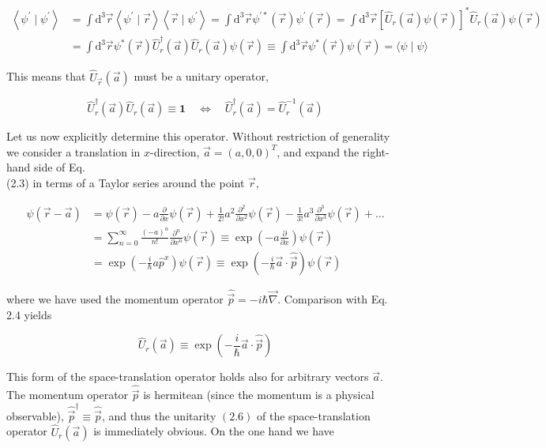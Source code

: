 \documentclass[10pt, letterpaper]{article}
\begin{document}
$$
\begin{aligned}
\left\langle\psi^{\prime} \mid \psi^{\prime}\right\rangle & =\int \mathrm{d}^{3} \vec{r}\left\langle\psi^{\prime} \mid \vec{r}\right\rangle\left\langle\vec{r} \mid \psi^{\prime}\right\rangle=\int \mathrm{d}^{3} \vec{r} \psi^{\prime *}(\vec{r}) \psi^{\prime}(\vec{r})=\int \mathrm{d}^{3} \vec{r}\left[\hat{U}_{r}(\vec{a}) \psi(\vec{r})\right]^{*} \hat{U}_{r}(\vec{a}) \psi(\vec{r}) \\
& =\int \mathrm{d}^{3} \vec{r} \psi^{*}(\vec{r}) \hat{U}_{r}^{\dagger}(\vec{a}) \hat{U}_{r}(\vec{a}) \psi(\vec{r}) \equiv \int \mathrm{d}^{3} \vec{r} \psi^{*}(\vec{r}) \psi(\vec{r})=\langle\psi \mid \psi\rangle
\end{aligned}
$$

This means that $\hat{U}_{\vec{r}}(\vec{a})$ must be a unitary operator,

$$
\hat{U}_{r}^{\dagger}(\vec{a}) \hat{U}_{r}(\vec{a}) \equiv \mathbf{1} \quad \Longleftrightarrow \quad \hat{U}_{r}^{\dagger}(\vec{a})=\hat{U}_{r}^{-1}(\vec{a})
$$

Let us now explicitly determine this operator. Without restriction of generality we consider a translation in $x$-direction, $\vec{a}=(a, 0,0)^{T}$, and expand the right-hand side of Eq.\\
(2.3) in terms of a Taylor series around the point $\vec{r}$,

$$
\begin{aligned}
\psi(\vec{r}-\vec{a}) & =\psi(\vec{r})-a \frac{\partial}{\partial x} \psi(\vec{r})+\frac{1}{2!} a^{2} \frac{\partial^{2}}{\partial x^{2}} \psi(\vec{r})-\frac{1}{3!} a^{3} \frac{\partial^{3}}{\partial x^{3}} \psi(\vec{r})+\ldots \\
& =\sum_{n=0}^{\infty} \frac{(-a)^{n}}{n!} \frac{\partial^{n}}{\partial x^{n}} \psi(\vec{r}) \equiv \exp \left(-a \frac{\partial}{\partial x}\right) \psi(\vec{r}) \\
& =\exp \left(-\frac{i}{\hbar} a \hat{p}^{x}\right) \psi(\vec{r}) \equiv \exp \left(-\frac{i}{\hbar} \vec{a} \cdot \hat{\vec{p}}\right) \psi(\vec{r})
\end{aligned}
$$

where we have used the momentum operator $\hat{\vec{p}}=-i \hbar \vec{\nabla}$. Comparison with Eq. 2.4 yields

$$
\hat{U}_{r}(\vec{a}) \equiv \exp \left(-\frac{i}{\hbar} \vec{a} \cdot \hat{\vec{p}}\right)
$$

This form of the space-translation operator holds also for arbitrary vectors $\vec{a}$. The momentum operator $\hat{\vec{p}}$ is hermitean (since the momentum is a physical observable), $\hat{\vec{p}}^{\dagger} \equiv \hat{\vec{p}}$, and thus the unitarity $(2.6)$ of the space-translation operator $\hat{U}_{r}(\vec{a})$ is immediately obvious. On the one hand we have
\end{document}

